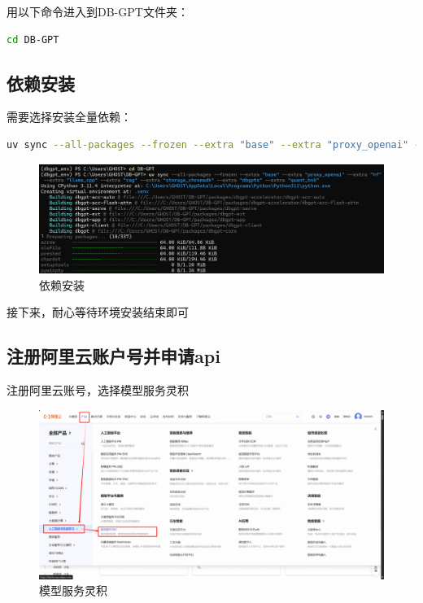 \documentclass{article}
\begin{document}
	用以下命令进入到DB-GPT文件夹：
	
	\begin{lstlisting}[language=bash, title=uv安装, tabsize=4]
		cd DB-GPT
	\end{lstlisting}
	
	\subsection{依赖安装}
	
	需要选择安装全量依赖：
	
	\begin{lstlisting}[language=bash, title=uv安装, tabsize=4]
		uv sync --all-packages --frozen --extra "base" --extra "proxy_openai" --extra "hf" --extra "llama_cpp" --extra "rag" --extra "storage_chromadb" --extra "dbgpts" --extra "quant_bnb"
	\end{lstlisting}
	
	\begin{figure}[H]
		\centering
		\includegraphics[width=13cm]{./images/11.依赖安装.png}
		\caption{依赖安装}
	\end{figure}
	
	接下来，耐心等待环境安装结束即可
	
	\subsection{注册阿里云账户号并申请api}
	
	注册阿里云账号，选择模型服务灵积
	
	\begin{figure}[H]
		\centering
		\includegraphics[width=13cm]{./images/12.模型服务灵积.png}
		\caption{模型服务灵积}
	\end{figure}
	
\end{document}
